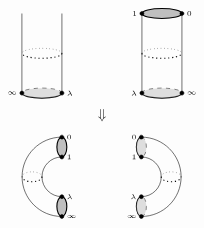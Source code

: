 {$$\begin{tikzpicture}[scale=0.5]
\draw [dashed] (-2, -2) arc (0:180:1 and 0.25);
\draw [thick] (-2, -2) arc (0:-180:1 and 0.25);
\fill [lightgray, opacity=0.5] (-3, -2) ellipse (1 and 0.25);
\draw [fill=black] (-4, -2) circle (0.1) node[left]{\tiny $ \infty $};
\draw [fill=black] (-2, -2) circle (0.1) node[right]{\tiny $ \lambda $};
\draw (-4, -2) to (-4, 2);
\draw (-2, -2) to (-2, 2);
\draw [dotted] (-2, 0) arc (0:180:1 and 0.25);
\draw [dotted, thick] (-2, 0) arc (0:-180:1 and 0.25);
\draw [fill=lightgray, thick] (3, 2) ellipse (1 and 0.25);
\draw [fill=black] (2, 2) circle (0.1) node[left]{\tiny $ 1 $};
\draw [fill=black] (4, 2) circle (0.1) node[right]{\tiny $ 0 $};
\draw [dashed] (2, -2) arc (180:0:1 and 0.25);
\draw [thick] (2, -2) arc (-180:0:1 and 0.25);
\fill [lightgray, opacity=0.5] (3, -2) ellipse (1 and 0.25);
\draw [fill=black] (2, -2) circle (0.1) node[left]{\tiny $ \lambda $};
\draw [fill=black] (4, -2) circle (0.1) node[right]{\tiny $ \infty $};
\draw (2, -2) to (2, 2);
\draw (4, -2) to (4, 2);
\draw [dotted] (2, 0) arc (180:0:1 and 0.25);
\draw [dotted, thick] (2, 0) arc (-180:0:1 and 0.25);
\end{tikzpicture}
$$
$$ \Downarrow $$
$$
\begin{tikzpicture}[scale=0.5]
\draw [fill=lightgray, thick] (-2, 1.5) ellipse (0.25 and 0.5);
\draw [fill=black] (-2, 2) circle (0.1) node[right]{\tiny $ 0 $};
\draw [fill=black] (-2, 1) circle (0.1) node[right]{\tiny $ 1 $};
\draw [fill=lightgray, thick] (-2, -1.5) ellipse (0.25 and 0.5);
\draw [fill=black] (-2, -1) circle (0.1) node[right]{\tiny $ \lambda $};
\draw [fill=black] (-2, -2) circle (0.1) node[right]{\tiny $ \infty $};
\draw (-2, 2) arc (90:270:2 and 2);
\draw (-2, 1) arc (90:270:1 and 1);
\draw [dotted] (-3, 0) arc (0:180:0.5 and 0.25);
\draw [dotted, thick] (-3, 0) arc (0:-180:0.5 and 0.25);
\draw [dashed] (2, 2) arc (90:-90:0.25 and 0.5);
\draw [thick] (2, 2) arc (90:270:0.25 and 0.5);
\fill [lightgray, opacity=0.5] (2, 1.5) ellipse (0.25 and 0.5);
\draw [fill=black] (2, 2) circle (0.1) node[left]{\tiny $ 0 $};
\draw [fill=black] (2, 1) circle (0.1) node[left]{\tiny $ 1 $};
\draw [dashed] (2, -2) arc (-90:90:0.25 and 0.5);
\draw [thick] (2, -2) arc (270:90:0.25 and 0.5);
\fill [lightgray, opacity=0.5] (2, -1.5) ellipse (0.25 and 0.5);
\draw [fill=black] (2, -1) circle (0.1) node[left]{\tiny $ \lambda $};
\draw [fill=black] (2, -2) circle (0.1) node[left]{\tiny $ \infty $};
\draw (2, 2) arc (90:-90:2 and 2);
\draw (2, 1) arc (90:-90:1 and 1);
\draw [dotted] (3, 0) arc (180:0:0.5 and 0.25);
\draw [dotted, thick] (3, 0) arc (-180:0:0.5 and 0.25);
\end{tikzpicture}
$$}

